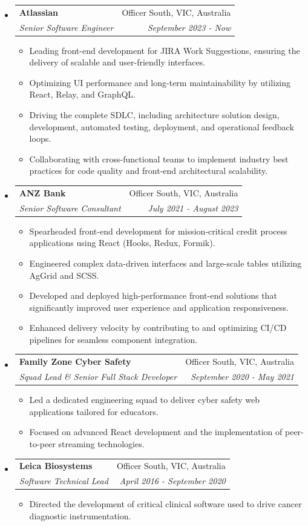 \documentclass[letterpaper,11pt]{article}
\makeatletter
\newcommand{\resitem}[1]{\item #1 \vspace{-2pt}}
\newcommand{\ressubheading}[4]{
    \begin{tabular*}{6.5in}{p{4.8in}@{\extracolsep{\fill}}r}
            \textbf{#1} & #2 \\
            \textit{#3} & \textit{#4} \\
    \end{tabular*}\vspace{-8pt}}
\makeatother
\begin{document}
      \begin{itemize}
        \item \ressubheading{Atlassian}{Officer South, VIC, Australia}{Senior Software Engineer}{September 2023 - Now}
        \begin{itemize}
            \resitem{Leading front-end development for JIRA Work Suggestions, ensuring the delivery of scalable and user-friendly interfaces.}
            \resitem{Optimizing UI performance and long-term maintainability by utilizing React, Relay, and GraphQL.}
            \resitem{Driving the complete SDLC, including architecture solution design, development, automated testing, deployment, and operational feedback loops.}
            \resitem{Collaborating with cross-functional teams to implement industry best practices for code quality and front-end architectural scalability.}
        \end{itemize}
        \item \ressubheading{ANZ Bank}{Officer South, VIC, Australia}{Senior Software Consultant}{July 2021 - August 2023}
        \begin{itemize}
            \resitem{Spearheaded front-end development for mission-critical credit process applications using React (Hooks, Redux, Formik).}
            \resitem{Engineered complex data-driven interfaces and large-scale tables utilizing AgGrid and SCSS.}
            \resitem{Developed and deployed high-performance front-end solutions that significantly improved user experience and application responsiveness.}
            \resitem{Enhanced delivery velocity by contributing to and optimizing CI/CD pipelines for seamless component integration.}
        \end{itemize}
        \item \ressubheading{Family Zone Cyber Safety}{Officer South, VIC, Australia}{Squad Lead \& Senior Full Stack Developer}{September 2020 - May 2021}
        \begin{itemize}
            \resitem{Led a dedicated engineering squad to deliver cyber safety web applications tailored for educators.}
            \resitem{Focused on advanced React development and the implementation of peer-to-peer streaming technologies.}
        \end{itemize}
        \item \ressubheading{Leica Biosystems}{Officer South, VIC, Australia}{Software Technical Lead}{April 2016 - September 2020}
        \begin{itemize}
            \resitem{Directed the development of critical clinical software used to drive cancer diagnostic instrumentation.}

\end{itemize}
\end{itemize}
\end{document}
